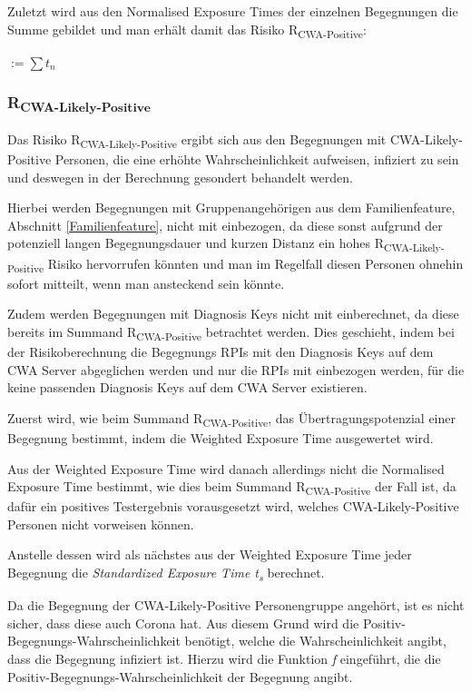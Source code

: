 \documentclass[conference,compsoc]{IEEEtran}
\begin{document}
Zuletzt wird aus den Normalised Exposure Times der einzelnen Begegnungen die Summe gebildet und man erhält damit das Risiko R\textsubscript{CWA-Positive}:

\centerline{\text{ }}
\centerline{  $ := \sum t_n$}
\centerline{\text{ }}

\subsubsection{R\textsubscript{CWA-Likely-Positive}}
\label{CWALikelyPositive}

Das Risiko R\textsubscript{CWA-Likely-Positive} ergibt sich aus den Begegnungen mit CWA-Likely-Positive Personen, 
die eine erhöhte Wahrscheinlichkeit aufweisen, infiziert zu sein und deswegen in der Berechnung gesondert behandelt werden. 

Hierbei werden Begegnungen mit Gruppenangehörigen aus dem Familienfeature, Abschnitt \ref{Familienfeature}, nicht mit einbezogen, 
da diese sonst aufgrund der potenziell langen Begegnungsdauer und 
kurzen Distanz ein hohes R\textsubscript{CWA-Likely-Positive} Risiko hervorrufen könnten und man im Regelfall diesen Personen ohnehin sofort mitteilt, wenn man ansteckend sein könnte. 

Zudem werden Begegnungen mit Diagnosis Keys nicht mit einberechnet, da diese bereits im Summand R\textsubscript{CWA-Positive} betrachtet werden. Dies geschieht, 
indem bei der Risikoberechnung die Begegnungs RPIs mit den Diagnosis Keys auf dem CWA Server abgeglichen werden und nur die RPIs mit einbezogen werden, 
für die keine passenden Diagnosis Keys auf dem CWA Server existieren.

Zuerst wird, wie beim Summand R\textsubscript{CWA-Positive}, das Übertragungspotenzial einer Begegnung bestimmt, indem die Weighted Exposure Time ausgewertet wird. 

Aus der Weighted Exposure Time wird danach allerdings nicht die Normalised Exposure Time bestimmt, wie dies beim Summand R\textsubscript{CWA-Positive} der Fall ist, 
da dafür ein positives Testergebnis vorausgesetzt wird, welches CWA-Likely-Positive Personen nicht vorweisen können.

Anstelle dessen wird als nächstes aus der Weighted Exposure Time jeder Begegnung die \textit{Standardized Exposure Time t\textsubscript{s}} berechnet.

Da die Begegnung der CWA-Likely-Positive Personengruppe angehört, ist es nicht sicher, dass diese auch Corona hat. 
Aus diesem Grund wird die Positiv-Begegnungs-Wahrscheinlichkeit benötigt, welche die Wahrscheinlichkeit angibt, dass die Begegnung infiziert ist. 
Hierzu wird die Funktion \textit{f} eingeführt, die die Positiv-Begegnungs-Wahrscheinlichkeit der Begegnung angibt.
\end{document}
